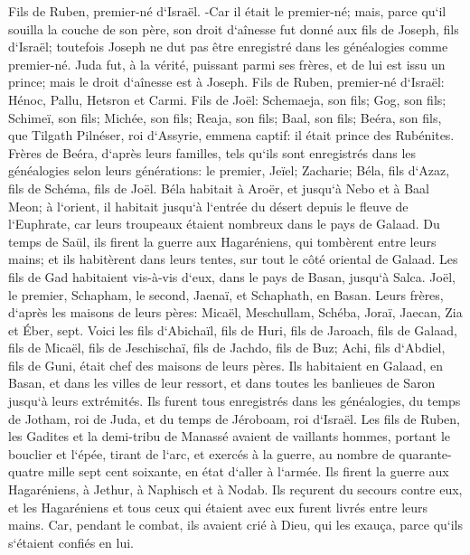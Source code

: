 \verse Fils de Ruben, premier-né d`Israël. -Car il était le premier-né; mais, parce qu`il souilla la couche de son père, son droit d`aînesse fut donné aux fils de Joseph, fils d`Israël; toutefois Joseph ne dut pas être enregistré dans les généalogies comme premier-né. 
\verse Juda fut, à la vérité, puissant parmi ses frères, et de lui est issu un prince; mais le droit d`aînesse est à Joseph. 
\verse Fils de Ruben, premier-né d`Israël: Hénoc, Pallu, Hetsron et Carmi. 
\verse Fils de Joël: Schemaeja, son fils; Gog, son fils; Schimeï, son fils; 
\verse Michée, son fils; Reaja, son fils; Baal, son fils; 
\verse Beéra, son fils, que Tilgath Pilnéser, roi d`Assyrie, emmena captif: il était prince des Rubénites. 
\verse Frères de Beéra, d`après leurs familles, tels qu`ils sont enregistrés dans les généalogies selon leurs générations: le premier, Jeïel; Zacharie; 
\verse Béla, fils d`Azaz, fils de Schéma, fils de Joël. Béla habitait à Aroër, et jusqu`à Nebo et à Baal Meon; 
\verse à l`orient, il habitait jusqu`à l`entrée du désert depuis le fleuve de l`Euphrate, car leurs troupeaux étaient nombreux dans le pays de Galaad. 
\verse Du temps de Saül, ils firent la guerre aux Hagaréniens, qui tombèrent entre leurs mains; et ils habitèrent dans leurs tentes, sur tout le côté oriental de Galaad. 
\verse Les fils de Gad habitaient vis-à-vis d`eux, dans le pays de Basan, jusqu`à Salca. 
\verse Joël, le premier, Schapham, le second, Jaenaï, et Schaphath, en Basan. 
\verse Leurs frères, d`après les maisons de leurs pères: Micaël, Meschullam, Schéba, Joraï, Jaecan, Zia et Éber, sept. 
\verse Voici les fils d`Abichaïl, fils de Huri, fils de Jaroach, fils de Galaad, fils de Micaël, fils de Jeschischaï, fils de Jachdo, fils de Buz; 
\verse Achi, fils d`Abdiel, fils de Guni, était chef des maisons de leurs pères. 
\verse Ils habitaient en Galaad, en Basan, et dans les villes de leur ressort, et dans toutes les banlieues de Saron jusqu`à leurs extrémités. 
\verse Ils furent tous enregistrés dans les généalogies, du temps de Jotham, roi de Juda, et du temps de Jéroboam, roi d`Israël. 
\verse Les fils de Ruben, les Gadites et la demi-tribu de Manassé avaient de vaillants hommes, portant le bouclier et l`épée, tirant de l`arc, et exercés à la guerre, au nombre de quarante-quatre mille sept cent soixante, en état d`aller à l`armée. 
\verse Ils firent la guerre aux Hagaréniens, à Jethur, à Naphisch et à Nodab. 
\verse Ils reçurent du secours contre eux, et les Hagaréniens et tous ceux qui étaient avec eux furent livrés entre leurs mains. Car, pendant le combat, ils avaient crié à Dieu, qui les exauça, parce qu`ils s`étaient confiés en lui. 
